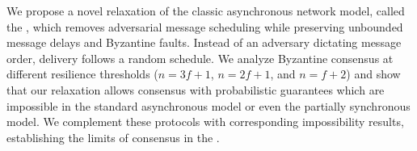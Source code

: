 We propose a novel relaxation of the classic asynchronous network model, called the \textit{\model}, which removes adversarial message scheduling while preserving unbounded message delays and Byzantine faults. Instead of an adversary dictating message order, delivery follows a random schedule. We analyze Byzantine consensus at different resilience thresholds ($n=3f+1$, $n=2f+1$, and $n=f+2$) and show that our relaxation allows consensus with probabilistic guarantees which are impossible in the standard asynchronous model or even the partially synchronous model. We complement these protocols with corresponding impossibility results, establishing the limits of consensus in the \model.



